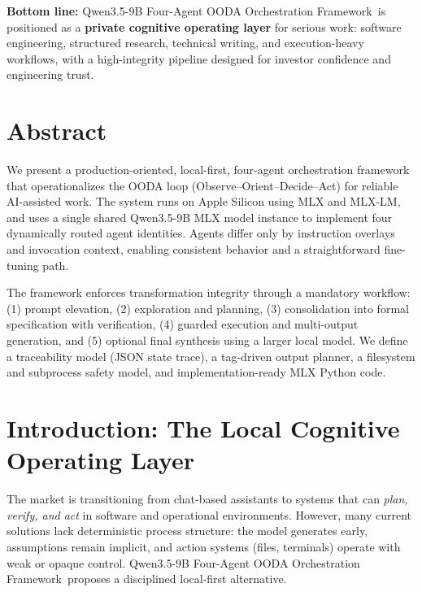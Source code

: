 \documentclass[11pt]{article}
\newcommand{\FrameworkName}{Qwen3.5-9B Four-Agent OODA Orchestration Framework}
\begin{document}
\vspace{6pt}
\noindent\textbf{Bottom line:} \FrameworkName\ is positioned as a \textbf{private cognitive operating layer} for serious work: software engineering, structured research, technical writing, and execution-heavy workflows, with a high-integrity pipeline designed for investor confidence and engineering trust.

\section*{Abstract}

We present a production-oriented, local-first, four-agent orchestration framework that operationalizes the OODA loop (Observe--Orient--Decide--Act) for reliable AI-assisted work.
The system runs on Apple Silicon using MLX and MLX-LM, and uses a single shared Qwen3.5-9B MLX model instance to implement four dynamically routed agent identities.
Agents differ only by instruction overlays and invocation context, enabling consistent behavior and a straightforward fine-tuning path.

The framework enforces transformation integrity through a mandatory workflow:
(1) prompt elevation,
(2) exploration and planning,
(3) consolidation into formal specification with verification,
(4) guarded execution and multi-output generation, and
(5) optional final synthesis using a larger local model.
We define a traceability model (JSON state trace), a tag-driven output planner, a filesystem and subprocess safety model, and implementation-ready MLX Python code.

\tableofcontents
\listoftables
\listoffigures
\newpage
{}

\section{Introduction: The Local Cognitive Operating Layer}

The market is transitioning from chat-based assistants to systems that can \emph{plan, verify, and act} in software and operational environments.
However, many current solutions lack deterministic process structure: the model generates early, assumptions remain implicit, and action systems (files, terminals) operate with weak or opaque control.
\FrameworkName\ proposes a disciplined local-first alternative.
\end{document}
